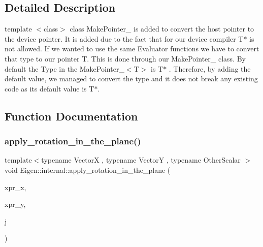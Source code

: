 \subsection{Detailed Description}
template $<$class$>$ class Make\+Pointer\+\_\+ is added to convert the host pointer to the device pointer. It is added due to the fact that for our device compiler T$\ast$ is not allowed. If we wanted to use the same Evaluator functions we have to convert that type to our pointer T. This is done through our Make\+Pointer\+\_\+ class. By default the Type in the Make\+Pointer\+\_\+$<$\+T$>$ is T$\ast$ . Therefore, by adding the default value, we managed to convert the type and it does not break any existing code as its default value is T$\ast$. 

\subsection{Function Documentation}
\mbox{\label{namespace_eigen_1_1internal_a5f7738a5c56c9b9decf94d9728ba7906}} 
\subsubsection{\texorpdfstring{apply\+\_\+rotation\+\_\+in\+\_\+the\+\_\+plane()}{apply\_rotation\_in\_the\_plane()}}
{\footnotesize\ttfamily template$<$typename VectorX , typename VectorY , typename Other\+Scalar $>$ \\
void Eigen\+::internal\+::apply\+\_\+rotation\+\_\+in\+\_\+the\+\_\+plane (\begin{DoxyParamCaption}\item[{\hyperlink{group___core___module_class_eigen_1_1_dense_base}{Dense\+Base}$<$ \hyperlink{group___core___module}{VectorX} $>$ \&}]{xpr\+\_\+x,  }\item[{\hyperlink{group___core___module_class_eigen_1_1_dense_base}{Dense\+Base}$<$ VectorY $>$ \&}]{xpr\+\_\+y,  }\item[{const \hyperlink{group___jacobi___module_class_eigen_1_1_jacobi_rotation}{Jacobi\+Rotation}$<$ Other\+Scalar $>$ \&}]{j }\end{DoxyParamCaption})}

